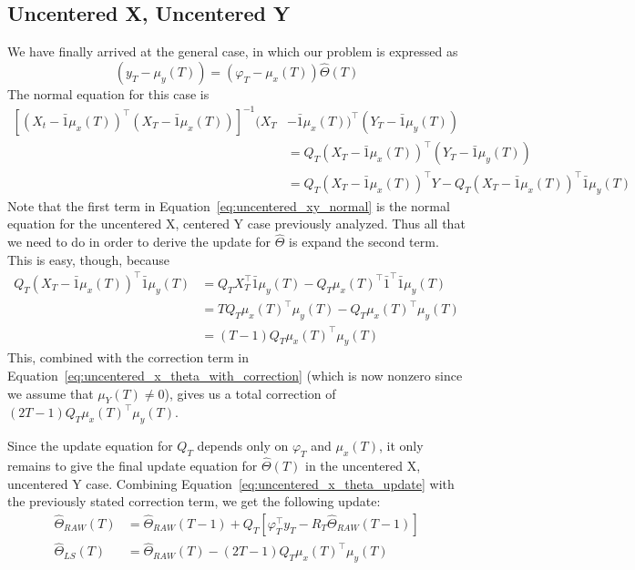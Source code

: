 \subsection{Uncentered X, Uncentered Y}
We have finally arrived at the general case, in which our problem is expressed as 
\begin{equation}
  (y_T - \mu_y(T)) = (\varphi_T - \mu_x(T))\hat\Theta(T)
\end{equation}
The normal equation for this case is 
\begin{align}
  \left[(X_t - \bar{1}\mu_x(T))^\top(X_T - \bar{1}\mu_x(T))\right]^{-1}(X_T &- \bar{1}\mu_x(T))^\top (Y_T - \bar{1}\mu_y(T)) \nonumber \\ &= Q_T(X_T - \bar{1}\mu_x(T))^\top (Y_T - \bar{1}\mu_y(T)) \\
                                                                            &= Q_T (X_T - \bar{1}\mu_x(T))^\top Y - Q_T(X_T - \bar{1}\mu_x(T))^\top\bar{1}\mu_y(T) \label{eq:uncentered_xy_normal}
\end{align}
Note that the first term in Equation~\ref{eq:uncentered_xy_normal} is the
normal equation for the uncentered X, centered Y case previously analyzed. Thus
all that we need to do in order to derive the update for $\hat\Theta$ is expand the second term. This is easy, though, because
\begin{align}
  Q_T(X_T - \bar{1}\mu_x(T))^\top\bar{1}\mu_y(T) &= Q_TX_T^\top\bar{1}\mu_y(T) - Q_T\mu_x(T)^\top\bar{1}^\top\bar{1}\mu_y(T)\\
                                                 &= TQ_T\mu_x(T)^\top \mu_y(T) - Q_T\mu_x(T)^\top\mu_y(T) \\
                                                 &= (T - 1)Q_T \mu_x(T)^\top \mu_y(T)
\end{align}
This, combined with the correction term in
Equation~\ref{eq:uncentered_x_theta_with_correction} (which is now nonzero
since we assume that $\mu_Y(T) \neq 0$), gives us a total correction of $(2T -
1) Q_T \mu_x(T)^\top \mu_y(T)$.

Since the update equation for $Q_T$ depends only on $\varphi_T$ and $\mu_x(T)$,
it only remains to give the final update equation for $\hat\Theta(T)$ in the
uncentered X, uncentered Y case. Combining Equation~\ref{eq:uncentered_x_theta_update} with the previously stated correction term, we get the following update:
\begin{align}
  \hat\Theta_{RAW}(T) &= \hat\Theta_{RAW}(T-1) + Q_T\left[\varphi_T^\top y_T - R_T\hat\Theta_{RAW}(T-1)\right]\\
  \hat\Theta_{LS}(T) &= \hat\Theta_{RAW}(T) - (2T - 1)Q_T\mu_x(T)^\top \mu_y(T)
\end{align}

